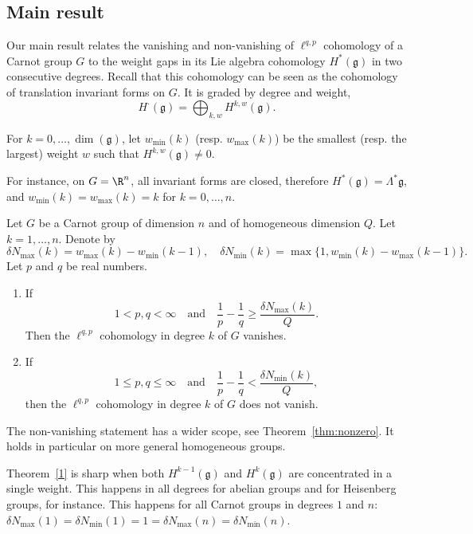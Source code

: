 \subsection{Main result}

Our main result relates the vanishing and non-vanishing of $\ell^{q,p}$ cohomology of a Carnot group $G$ to the weight gaps in its Lie algebra cohomology $H^*(\mathfrak{g})$ in two consecutive degrees. Recall that this cohomology can be seen as the cohomology of translation invariant forms on $G$. It is graded by degree and weight,
\[
H^\cdot(\mathfrak{g})=\bigoplus_{k,w}H^{k,w}(\mathfrak{g}).
\]

\begin{defi}
For $k=0,\dots,\dim(\mathfrak{g})$, let $w_{\min}(k)$ (resp. $w_{\max}(k)$) be the smallest (resp. the largest) weight $w$ such that $H^{k,w}(\mathfrak{g})\not=0$.
\end{defi}

For instance, on $G=\R^n$, all invariant forms are closed, therefore $H^*(\mathfrak{g}) = \Lambda^* \mathfrak{g}$, and $w_{\min}(k) =w_{\max}(k) = k$ for $k=0, \dots, n$.

\begin{theo}\label{1}
Let $G$ be a Carnot group of dimension $n$ and of homogeneous dimension $Q$. Let $k=1,\dots,n$. Denote by
\[
\delta N_{\max}(k)=w_{\max}(k)-w_{\min}(k-1),\quad \delta N_{\min}(k)=\max\{1,w_{\min}(k)-w_{\max}(k-1)\}.
\]
Let $p$ and $q$ be real numbers.
\begin{enumerate}%
\item \label{1.3.1} If
\[
1<p,q<\infty \quad \text{and}\quad
\frac{1}{p}-\frac{1}{q}\geq\frac{\delta N_{\max}(k)}{Q}.
\]
Then the $\ell^{q,p}$ cohomology in degree $k$ of $G$ vanishes.
\item \label{1.3.2} If
\[
1\leq p,q\leq\infty \quad \text{and}\quad
\frac{1}{p}-\frac{1}{q}<\frac{\delta N_{\min}(k)}{Q},
\]
then the $\ell^{q,p}$ cohomology in degree $k$ of $G$ does not vanish.
\end{enumerate}
\end{theo}

The non-vanishing statement has a wider scope, see Theorem~\ref{thm:nonzero}. It holds in particular on more general homogeneous groups.

Theorem~\ref{1} is sharp when both $H^{k-1}(\mathfrak{g})$ and $H^{k}(\mathfrak{g})$ are concentrated in a single weight. This happens in all degrees for abelian groups and for Heisenberg groups, for instance. This happens for all Carnot groups in degrees $1$ and $n$: $\delta N_{\max}(1)=\delta N_{\min}(1)=1=\delta N_{\max}(n)=\delta N_{\min}(n)$.

